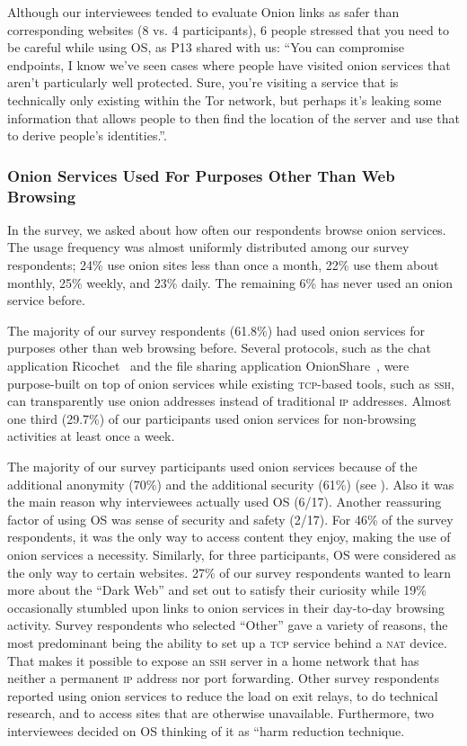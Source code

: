 Although our interviewees tended to evaluate Onion links as safer than corresponding websites (8 vs. 4 participants), 6 people stressed that you need to be careful while using OS, as P13 shared with us: “You can compromise endpoints, I know we've seen cases where people have visited onion services that aren't particularly well protected. Sure, you're visiting a service that is technically only existing within the Tor network, but perhaps it's leaking some information that allows people to then find the location of the server and use that to derive people's identities.”. 

\subsubsection{Onion Services Used For Purposes Other Than Web Browsing}
In the survey, we asked about how often our respondents browse onion
services.  The usage frequency was almost uniformly distributed among our survey
respondents; 24\% use onion sites less than once a month, 22\% use them about
monthly, 25\% weekly, and 23\% daily.  The remaining 6\% has never used an onion
service before.

The majority of our survey respondents (61.8\%) had used onion services for purposes
other than web browsing before.  Several protocols, such as the chat application
Ricochet~\cite{ricochet} and the file sharing application
OnionShare~\cite{onionshare}, were purpose-built on top of onion services while
existing \textsc{tcp}-based tools, such as \textsc{ssh}, can transparently use
onion addresses instead of traditional \textsc{ip} addresses.  Almost one third
(29.7\%) of our participants used onion services for non-browsing activities at
least once a week. 

The majority of our survey participants  used onion services
because of the additional anonymity (70\%) and the additional security (61\%) (see ). Also it was the main reason why interviewees actually used OS (6/17). Another reassuring factor of using OS was sense of security and safety (2/17).   
For 46\% of the survey respondents, it was the only way to access content they enjoy, making the use of
onion services a necessity. Similarly, for three participants, OS were considered as the only way to certain websites. 27\% of our survey respondents wanted to learn more about
the ``Dark Web'' and set out to satisfy their curiosity while 19\% occasionally
stumbled upon links to onion services in their day-to-day browsing activity.
Survey respondents who selected ``Other'' gave a variety of reasons, the most
predominant being the ability to set up a \textsc{tcp} service behind a
\textsc{nat} device.  That makes it possible to expose an \textsc{ssh} server in
a home network that has neither a permanent \textsc{ip} address nor port
forwarding.  Other survey respondents reported using onion services to reduce the load on exit relays, to do
technical research, and to access sites that are otherwise unavailable. Furthermore, two interviewees decided on OS thinking of it as “harm reduction technique.

